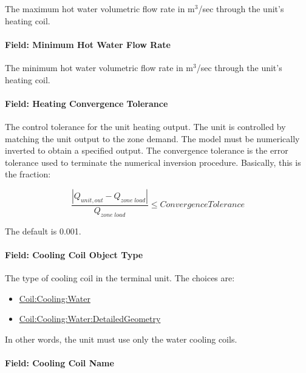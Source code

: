 The maximum hot water volumetric flow rate in m\(^{3}\)/sec through the unit's heating coil.

\paragraph{Field: Minimum Hot Water Flow Rate}\label{field-minimum-hot-water-flow-rate}

The minimum hot water volumetric flow rate in m\(^{3}\)/sec through the unit's heating coil.

\paragraph{Field: Heating Convergence Tolerance}\label{field-heating-convergence-tolerance}

The control tolerance for the unit heating output. The unit is controlled by matching the unit output to the zone demand. The model must be numerically inverted to obtain a specified output. The convergence tolerance is the error tolerance used to terminate the numerical inversion procedure. Basically, this is the fraction:

\begin{equation}
\frac{{\left| {{Q_{unit,out}} - {Q_{zone\;load}}} \right|}}{{{Q_{zone\;load}}}} \le ConvergenceTolerance
\end{equation}

The default is 0.001.

\paragraph{Field: Cooling Coil Object Type}\label{field-cooling-coil-object-type}

The type of cooling coil in the terminal unit. The choices are:

\begin{itemize}
\item
  \hyperref[coilcoolingwater]{Coil:Cooling:Water}
\item
  \hyperref[coilcoolingwaterdetailedgeometry]{Coil:Cooling:Water:DetailedGeometry}
\end{itemize}

In other words, the unit must use only the water cooling coils.

\paragraph{Field: Cooling Coil Name}\label{field-cooling-coil-name}

